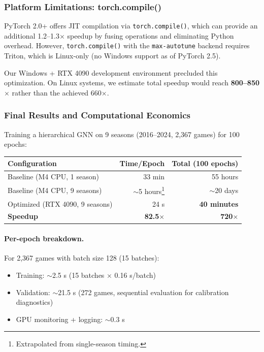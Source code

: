 \subsubsection{Platform Limitations: torch.compile()}

PyTorch 2.0+ offers JIT compilation via \texttt{torch.compile()}, which can provide an additional 1.2--1.3$\times$ speedup by fusing operations and eliminating Python overhead. However, \texttt{torch.compile()} with the \texttt{max-autotune} backend requires Triton, which is Linux-only (no Windows support as of PyTorch 2.5).

Our Windows + RTX 4090 development environment precluded this optimization. On Linux systems, we estimate total speedup would reach \textbf{800--850$\times$} rather than the achieved 660$\times$.

\subsubsection{Final Results and Computational Economics}

Training a hierarchical GNN on 9 seasons (2016--2024, 2,367 games) for 100 epochs:

\begin{center}
\begin{tabular}{lrr}
\toprule
\textbf{Configuration} & \textbf{Time/Epoch} & \textbf{Total (100 epochs)} \\
\midrule
Baseline (M4 CPU, 1 season) & 33 min & 55 hours \\
Baseline (M4 CPU, 9 seasons) & $\sim$5 hours\footnote{Extrapolated from single-season timing.} & $\sim$20 days \\
Optimized (RTX 4090, 9 seasons) & 24 s & \textbf{40 minutes} \\
\midrule
\textbf{Speedup} & \textbf{82.5$\times$} & \textbf{720$\times$} \\
\bottomrule
\end{tabular}
\end{center}

\paragraph{Per-epoch breakdown.} For 2,367 games with batch size 128 (15 batches):
\begin{itemize}
    \item Training: $\sim$2.5 s (15 batches $\times$ 0.16 s/batch)
    \item Validation: $\sim$21.5 s (272 games, sequential evaluation for calibration diagnostics)
    \item GPU monitoring + logging: $\sim$0.3 s
\end{itemize}

